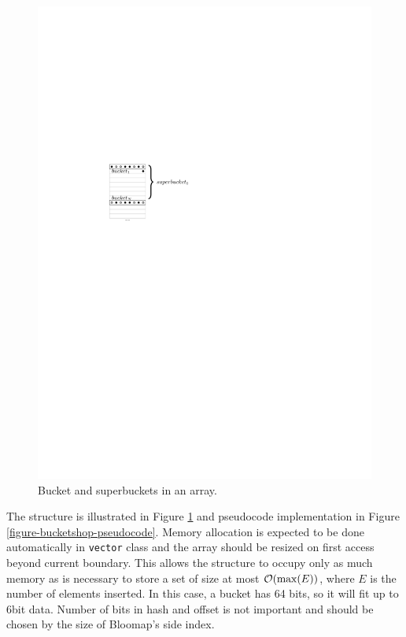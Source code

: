 \begin{figure}[!ht]
	\centering\hspace{2.5cm}
	\includegraphics{img/bucketshop.pdf}
	\caption{Bucket and superbuckets in an array.}
	\label{figure-bucketshop}
\end{figure}

The structure is illustrated in Figure \ref{figure-bucketshop} and pseudocode
implementation in Figure \ref{figure-bucketshop-pseudocode}. Memory allocation
is expected to be done automatically in {\tt vector} class and the array should
be resized on first access beyond current boundary.  This allows the structure
to occupy only as much memory as is necessary to store a set of size at most
$\mathcal{O}(\max(E))$, where $E$ is the number of elements inserted. In this case, a
bucket has 64 bits, so it will fit up to 6bit data. Number of bits in hash and
offset is not important and should be chosen by the size of Bloomap's side
index.

